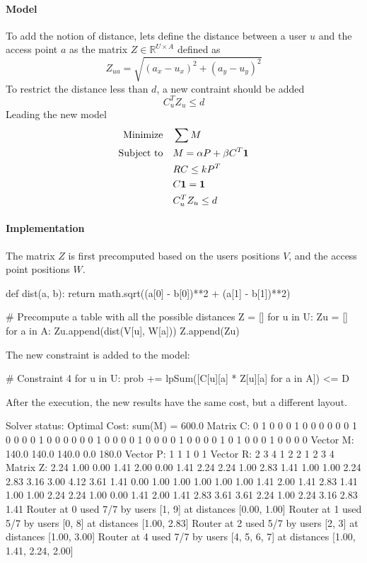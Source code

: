 \documentclass[11pt,a4paper]{article}
\begin{document}
\paragraph*{Model}

To add the notion of distance, lets define the distance between a user $u$ and 
the access point $a$ as the matrix $Z \in \mathbb{R}^{U \times A}$ defined as
%
$$ Z_{ua} = \sqrt{(a_x - u_x)^2 + (a_y - u_y)^2} $$
%
To restrict the distance less than $d$, a new contraint should be added
%
$$ C_u^T Z_u \le d $$
%
Leading the new model
%
\begin{align}
\text{Minimize} \quad & \sum M \nonumber\\
\text{Subject to}	 \setcounter{equation}{0} \quad & M = \alpha P + \beta C^T 
\bf{1} \\
& RC \le k P^T \\
& C \bf{1} = \bf{1} \\
& C_u^T Z_u \le d
\end{align}

\paragraph*{Implementation}

The matrix $Z$ is first precomputed based on the users positions $V$, and the 
access point positions $W$.
%
\begin{pycode}
def dist(a, b):
	return math.sqrt((a[0] - b[0])**2 + (a[1] - b[1])**2)

# Precompute a table with all the possible distances
Z = []
for u in U:
	Zu = []
	for a in A:
		Zu.append(dist(V[u], W[a]))
	Z.append(Zu)
\end{pycode}
%
The new constraint is added to the model:
%
\begin{pycode}
# Constraint 4
for u in U:
	prob += lpSum([C[u][a] * Z[u][a] for a in A]) <= D
\end{pycode}
%
After the execution, the new results have the same cost, but a different layout.
%
\begin{textcode}
Solver status: Optimal
Cost: sum(M) = 600.0
Matrix C:
  0  1  0  0  0
  1  0  0  0  0
  0  0  1  0  0
  0  0  1  0  0
  0  0  0  0  1
  0  0  0  0  1
  0  0  0  0  1
  0  0  0  0  1
  0  1  0  0  0
  1  0  0  0  0
Vector M:
  140.0  140.0  140.0  0.0  180.0
Vector P:
  1  1  1  0  1
Vector R:
  2  3  4  1  2  2  1  2  3  4
Matrix Z:
  2.24  1.00  0.00  1.41  2.00
  0.00  1.41  2.24  2.24  1.00
  2.83  1.41  1.00  1.00  2.24
  2.83  3.16  3.00  4.12  3.61
  1.41  0.00  1.00  1.00  1.00
  1.00  1.00  1.41  2.00  1.41
  2.83  1.41  1.00  1.00  2.24
  2.24  1.00  0.00  1.41  2.00
  1.41  2.83  3.61  3.61  2.24
  1.00  2.24  3.16  2.83  1.41
Router at 0 used 7/7 by users [1, 9] at distances [0.00, 1.00]
Router at 1 used 5/7 by users [0, 8] at distances [1.00, 2.83]
Router at 2 used 5/7 by users [2, 3] at distances [1.00, 3.00]
Router at 4 used 7/7 by users [4, 5, 6, 7] at distances [1.00, 1.41, 2.24, 2.00]
\end{textcode}
\end{document}

